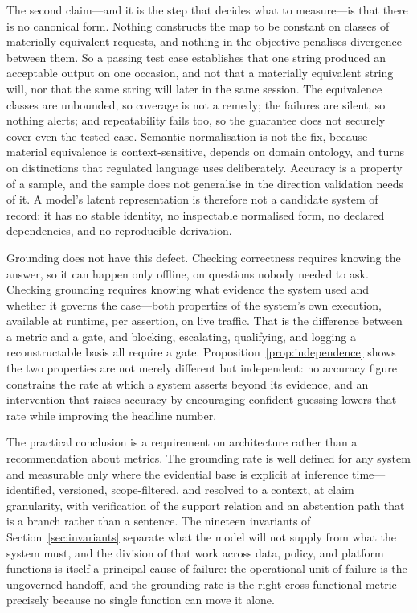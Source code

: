 \documentclass[11pt]{article}
\theoremstyle{plain}
\theoremstyle{definition}
\begin{document}
The second claim---and it is the step that decides what to measure---is that there
is no canonical form. Nothing constructs the map to be constant on classes of materially equivalent
requests, and nothing in the objective penalises divergence between them. So a
passing test case establishes that one string produced an acceptable output on one
occasion, and not that a materially equivalent string will, nor that the same string
will later in the same session. The equivalence classes are unbounded, so coverage
is not a remedy; the failures are silent, so nothing alerts; and repeatability fails
too, so the guarantee does not securely cover even the tested case. Semantic
normalisation is not the fix, because material equivalence is context-sensitive,
depends on domain ontology, and turns on distinctions that regulated language uses
deliberately. Accuracy is a property of a sample, and the sample does not generalise
in the direction validation needs of it. A model's latent representation is
therefore not a candidate system of record: it has no stable identity, no
inspectable normalised form, no declared dependencies, and no reproducible
derivation.

Grounding does not have this defect. Checking correctness requires knowing
the answer, so it can happen only offline, on questions nobody needed to ask.
Checking grounding requires knowing what evidence the system used and whether it
governs the case---both properties of the system's own execution, available at
runtime, per assertion, on live traffic. That is the difference between a metric and
a gate, and blocking, escalating, qualifying, and logging a reconstructable basis all
require a gate. Proposition~\ref{prop:independence} shows the two properties are not
merely different but independent: no accuracy figure constrains the rate at which a
system asserts beyond its evidence, and an intervention that raises accuracy by
encouraging confident guessing lowers that rate while improving the headline number.

The practical conclusion is a requirement on architecture rather than a
recommendation about metrics. The grounding rate is well defined for any system and
measurable only where the evidential base is explicit at inference
time---identified, versioned, scope-filtered, and resolved to a context, at claim
granularity, with verification of the support relation and an abstention path that
is a branch rather than a sentence. The nineteen invariants of
Section~\ref{sec:invariants} separate what the model will not supply from what the
system must, and the division of that work across data, policy, and platform
functions is itself a principal cause of failure: the operational unit of failure is
the ungoverned handoff, and the grounding rate is the right cross-functional metric
precisely because no single function can move it alone.
\end{document}
